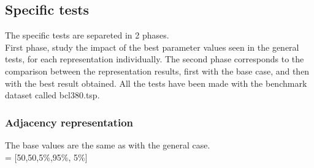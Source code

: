\subsection{Specific tests}

The specific tests are separeted in 2 phases.\\
 First phase, study the impact of the best parameter values seen in the general
tests, for each representation individually. The second phase
corresponds to the comparison between the representation results, first with the
base case, and then with the best result obtained.
All the tests have been made with the benchmark dataset called bcl380.tsp.

\subsubsection{Adjacency representation}

The base values are the same as with the general case.\\
 = [50,50,5\%,95\%, 5\%\big]\\

